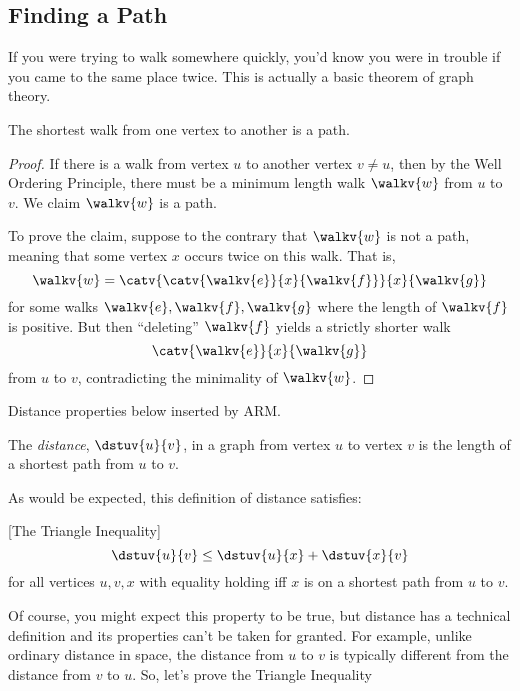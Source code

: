 \subsection{Finding a Path}
If you were trying to walk somewhere quickly, you'd know you were in
trouble if you came to the same place twice.  This is actually a basic
theorem of graph theory.

\begin{theorem}\label{shortestwalk_thm}
The shortest walk from one vertex to another is a path.
\end{theorem}

\begin{proof}
  If there is a walk from vertex $u$ to another vertex $v \neq u$,
  then by the Well Ordering Principle, there must be a minimum length
  walk $\walkv{w}$ from $u$ to~$v$.  We claim $\walkv{w}$ is a path.

  To prove the claim, suppose to the contrary that $\walkv{w}$ is not a
  path, meaning that some vertex $x$ occurs twice on this walk.  That is,
\[
\walkv{w} = \catv{\catv{\walkv{e}}{x}{\walkv{f}}}{x}{\walkv{g}}
\]
for some walks $\walkv{e}, \walkv{f}, \walkv{g}$ where the length of
$\walkv{f}$ is positive.  But then ``deleting'' $\walkv{f}$ yields a
strictly shorter walk
\[
\catv{\walkv{e}}{x}{\walkv{g}}
\]
from $u$ to $v$, contradicting the minimality of $\walkv{w}$.
\end{proof}

\iffalse

Actually, we proved something stronger:
\begin{corollary}\label{pathlewalk_cor}
For any walk in a digraph, there is a path starting and ending at the
same vertices as the walk and containing only edges in the walk.  Such
a path is necessarily no longer than the walk.
\end{corollary}
\fi

\begin{editingnotes}
Distance properties below inserted by ARM.
\end{editingnotes}

\begin{definition}
  The \emph{distance},
  $\dstuv{u}{v}$, in a graph from vertex $u$ to vertex $v$ is the
  length of a shortest path from $u$ to $v$.
\end{definition}

As would be expected, this definition of distance satisfies:
\begin{lemma}\label{lem:tri-ineq} [The Triangle Inequality]
\[
\dstuv{u}{v} \leq \dstuv{u}{x} + \dstuv{x}{v}
\]
for all vertices $u,v,x$ with equality holding iff $x$ is on a shortest
path from $u$ to $v$.
\end{lemma}
Of course, you might expect this property to be true, but distance has a
technical definition and its properties can't be taken for granted.
For example, unlike ordinary distance in space, the distance from $u$
to $v$ is typically different from the distance from $v$ to $u$.
So, let's prove the Triangle Inequality

